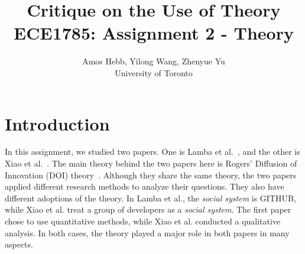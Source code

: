 \documentclass[journal,12pt,onecolumn,]{IEEEtran}
\begin{document}
\title{Critique on the Use of Theory\\
{\normalsize ECE1785: Assignment 2 - Theory}}

\author{Amos Hebb, Yilong Wang, Zhenyue Yu\\ \small University of Toronto}

\maketitle






\section{Introduction}
In this assignment, we studied two papers. One is Lamba et al.~\cite{lamba2020heard}, and the other is Xiao et al.~\cite{xiao2014social}. The main theory behind the two papers here is Rogers' Diffusion of Innovation (DOI) theory~\cite{rogers1995attributes}.
Although they share the same theory, the two papers applied different research methods to analyze their questions. They also have different adoptions of the theory. In Lamba et al., the \textit{social system} is GITHUB, while Xiao et al. treat a group of developers as a \textit{social system}.
The first paper chose to use quantitative methods, while Xiao et al. conducted a qualitative analysis. In both cases, the theory played a major role in both papers in many aspects.

\end{document}
